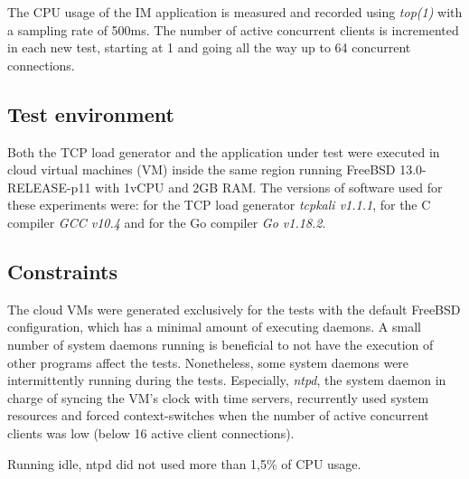 The CPU usage of the IM application is measured and recorded using \textit{top(1)} with a sampling rate of 500ms. The number of active concurrent clients is incremented in each new test, starting at 1 and going all the way up to 64 concurrent connections.

\subsection{Test environment}
Both the TCP load generator and the application under test were executed in cloud virtual machines (VM) inside the same region running FreeBSD 13.0-RELEASE-p11 with 1vCPU and 2GB RAM. The versions of software used for these experiments were: for the TCP load generator \textit{tcpkali v1.1.1}, for the C compiler \textit{GCC v10.4} and for the Go compiler \textit{Go v1.18.2}.

\subsection{Constraints}
The cloud VMs were generated exclusively for the tests with the default FreeBSD configuration, which has a minimal amount of executing daemons. A small number of system daemons running is beneficial to not have the execution of other programs affect the tests. Nonetheless, some system daemons were intermittently running during the tests. Especially, \textit{ntpd}, the system daemon in charge of syncing the VM's clock with time servers, recurrently used system resources and forced context-switches when the number of active concurrent clients was low (below 16 active client connections). 

Running idle, ntpd did not used more than 1,5\% of CPU usage.

